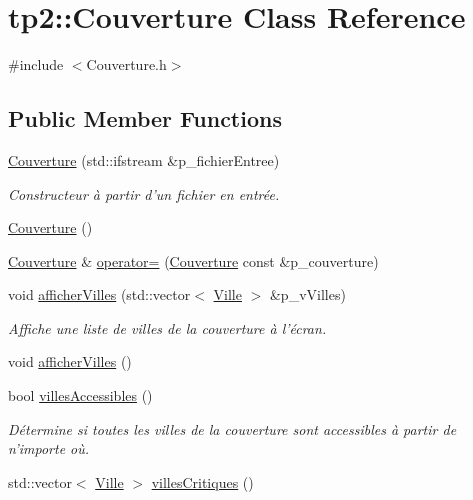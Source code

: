 \hypertarget{classtp2_1_1_couverture}{
\section{tp2::Couverture Class Reference}
\label{classtp2_1_1_couverture}
}


{\ttfamily \#include $<$Couverture.h$>$}

\subsection*{Public Member Functions}
\begin{DoxyCompactItemize}
\item 
\hyperlink{classtp2_1_1_couverture_a09d50ea815624aca22ff92847c76318d}{Couverture} (std::ifstream \&p\_\-fichierEntree)
\begin{DoxyCompactList}\small\item\em Constructeur à partir d'un fichier en entrée. \end{DoxyCompactList}\item 
\hyperlink{classtp2_1_1_couverture_a282d4cb84b4447ad17a291f379e815f9}{Couverture} ()
\item 
\hyperlink{classtp2_1_1_couverture}{Couverture} \& \hyperlink{classtp2_1_1_couverture_a6c87e1b01b08a9ab2593ab5b08034a94}{operator=} (\hyperlink{classtp2_1_1_couverture}{Couverture} const \&p\_\-couverture)
\item 
void \hyperlink{classtp2_1_1_couverture_ad2404ee49646bff274f688da3e9432fd}{afficherVilles} (std::vector$<$ \hyperlink{classtp2_1_1_ville}{Ville} $>$ \&p\_\-vVilles)
\begin{DoxyCompactList}\small\item\em Affiche une liste de villes de la couverture à l'écran. \end{DoxyCompactList}\item 
void \hyperlink{classtp2_1_1_couverture_a35cd466b6de9645503f1f9990737fba8}{afficherVilles} ()
\item 
bool \hyperlink{classtp2_1_1_couverture_a5833a97dda1028931023acc524bb3a2d}{villesAccessibles} ()
\begin{DoxyCompactList}\small\item\em Détermine si toutes les villes de la couverture sont accessibles à partir de n'importe où. \end{DoxyCompactList}\item 
std::vector$<$ \hyperlink{classtp2_1_1_ville}{Ville} $>$ \hyperlink{classtp2_1_1_couverture_ab581fbf5e7bc482776425510704602da}{villesCritiques} ()

\end{DoxyCompactItemize}
